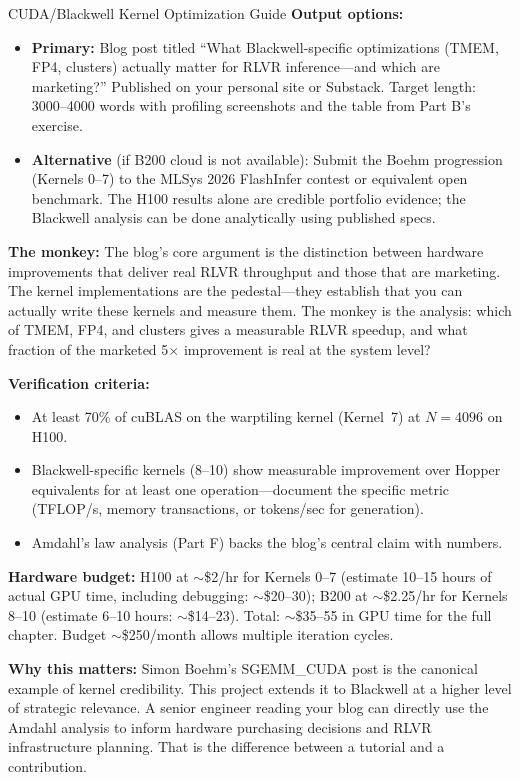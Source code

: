 \begin{portfolio}{CUDA/Blackwell Kernel Optimization Guide}
\textbf{Output options:}
\begin{itemize}
  \item \textbf{Primary:} Blog post titled ``What Blackwell-specific optimizations (TMEM, FP4, clusters) actually matter for RLVR inference---and which are marketing?'' Published on your personal site or Substack. Target length: 3000--4000 words with profiling screenshots and the table from Part B's exercise.
  \item \textbf{Alternative} (if B200 cloud is not available): Submit the Boehm progression (Kernels 0--7) to the MLSys 2026 FlashInfer contest or equivalent open benchmark. The H100 results alone are credible portfolio evidence; the Blackwell analysis can be done analytically using published specs.
\end{itemize}

\textbf{The monkey:} The blog's core argument is the distinction between hardware improvements that deliver real RLVR throughput and those that are marketing. The kernel implementations are the pedestal---they establish that you can actually write these kernels and measure them. The monkey is the analysis: which of TMEM, FP4, and clusters gives a measurable RLVR speedup, and what fraction of the marketed 5$\times$ improvement is real at the system level?

\textbf{Verification criteria:}
\begin{itemize}
  \item At least 70\% of cuBLAS on the warptiling kernel (Kernel~7) at $N=4096$ on H100.
  \item Blackwell-specific kernels (8--10) show measurable improvement over Hopper equivalents for at least one operation---document the specific metric (TFLOP/s, memory transactions, or tokens/sec for generation).
  \item Amdahl's law analysis (Part F) backs the blog's central claim with numbers.
\end{itemize}

\textbf{Hardware budget:} H100 at $\sim$\$2/hr for Kernels 0--7 (estimate 10--15 hours of actual GPU time, including debugging: $\sim$\$20--30); B200 at $\sim$\$2.25/hr for Kernels 8--10 (estimate 6--10 hours: $\sim$\$14--23). Total: $\sim$\$35--55 in GPU time for the full chapter. Budget $\sim$\$250/month allows multiple iteration cycles.

\textbf{Why this matters:} Simon Boehm's SGEMM\_CUDA post is the canonical example of kernel credibility. This project extends it to Blackwell at a higher level of strategic relevance. A senior engineer reading your blog can directly use the Amdahl analysis to inform hardware purchasing decisions and RLVR infrastructure planning. That is the difference between a tutorial and a contribution.
\end{portfolio}

\newpage

